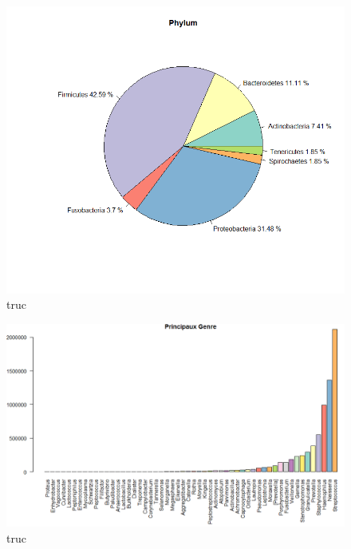 \documentclass[12pt,a4paper]{article}
\begin{document}
\begin{figure}[!h]
\begin{center}
\includegraphics[scale=0.5]{img/phylum.png}\hfill
\end{center}
\caption{truc}
\label{phylum}
\end{figure}

\begin{figure}[!h]
\begin{center}
\includegraphics[scale=0.5]{img/genus.png}\hfill
\end{center}
\caption{truc}
\label{genus}
\end{figure}
\end{document}
